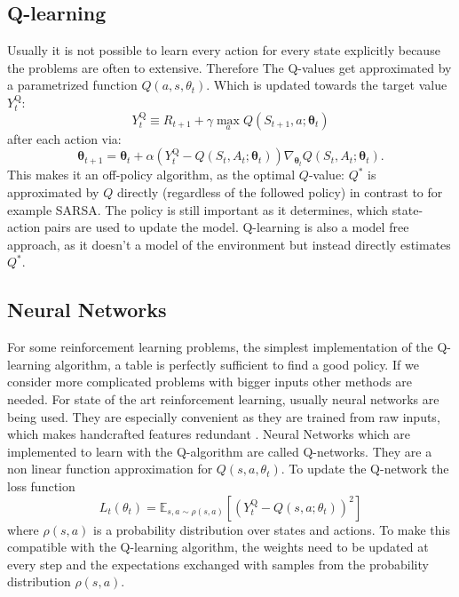 \documentclass[12pt]{article}
\begin{document}
\subsection{Q-learning}
Usually it is not possible to learn every action for every state explicitly because the problems are often to extensive. Therefore The Q-values get approximated by a parametrized function $Q(a,s,\theta_t)$. Which is updated towards the target value $Y_{t}^{\mathrm{Q}}$:
\begin{equation}
Y_{t}^{\mathrm{Q}} \equiv R_{t+1}+\gamma \max _{a} Q\left(S_{t+1}, a ; \boldsymbol{\theta}_{t}\right)
\end{equation}
after each action via:
\begin{equation}
\boldsymbol{\theta}_{t+1}=\boldsymbol{\theta}_{t}+\alpha\left(Y_{t}^{\mathrm{Q}}-Q\left(S_{t}, A_{t} ; \boldsymbol{\theta}_{t}\right)\right) \nabla_{\boldsymbol{\theta}_{t}} Q\left(S_{t}, A_{t} ; \boldsymbol{\theta}_{t}\right).
\end{equation}
\cite{DBLP:journals/corr/HasseltGS15}
This makes it an off-policy algorithm, as the optimal $Q$-value: $Q^*$ is approximated by $Q$ directly (regardless of the followed policy) in contrast to for example SARSA. The policy is still important as it determines, which state-action pairs are used to update the model\cite{Sutton:1998:IRL:551283}. 
Q-learning is also a model free approach, as it doesn't a model of the environment but instead directly estimates $Q^*$.

\subsection{Neural Networks}
For some reinforcement learning problems, the simplest implementation of the Q-learning algorithm, a table is perfectly sufficient to find a good policy.
If we consider more complicated problems with bigger inputs other methods are needed. For state of the art reinforcement learning, usually neural networks are being used. %
They are especially convenient as they are trained from raw inputs, which makes handcrafted features redundant \cite{DBLP:journals/corr/MnihKSGAWR13}.
Neural Networks which are implemented to learn with the Q-algorithm are called Q-networks.
They are a non linear function approximation for $Q(s,a,\theta_t)$.
To update the Q-network the loss function
\begin{equation}
L_{t}\left(\theta_{t}\right)=\mathbb{E}_{s, a \sim \rho(s,a)}\left[\left(Y_{t}^{\mathrm{Q}}-Q\left(s, a ; \theta_{t}\right)\right)^{2}\right]
\end{equation}
where $\rho(s, a)$ is a probability distribution over states and actions. To make this compatible with the Q-learning algorithm, the weights need to be updated at every step and the expectations exchanged with samples from the probability distribution $\rho(s,a)$.
\end{document}
